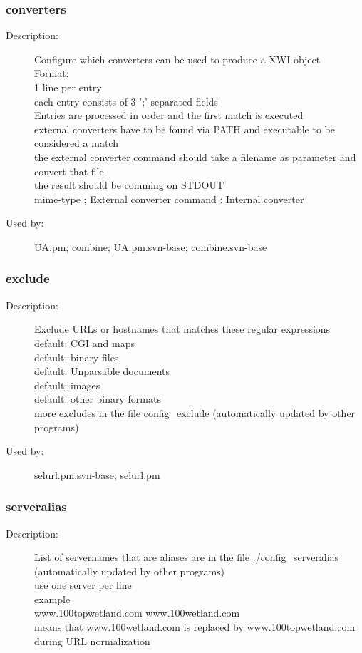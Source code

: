 \subsubsection{converters}
\label{converters}
\begin{description}
\item[Description:] Configure which converters can be used to produce a XWI object \\ Format: \\   1 line per entry \\   each entry consists of 3 ';' separated fields \\ Entries are processed in order and the first match is executed \\   external converters have to be found via PATH and executable to be considered a match \\   the external converter command should take a filename as parameter and convert that file \\    the result should be comming on STDOUT \\  mime-type   ;   External converter command ; Internal converter
\item[Used by:] UA.pm; combine; UA.pm.svn-base; combine.svn-base
\end{description}
\subsubsection{exclude}
\label{exclude}
\begin{description}
\item[Description:] Exclude URLs or hostnames that matches these regular expressions \\  default: CGI and maps \\  default: binary files \\  default: Unparsable documents \\  default: images \\  default: other binary formats \\ more excludes in the file config\_exclude (automatically updated by other programs)
\item[Used by:] selurl.pm.svn-base; selurl.pm
\end{description}
\subsubsection{serveralias}
\label{serveralias}
\begin{description}
\item[Description:] List of servernames that are aliases are in the file ./config\_serveralias \\     (automatically updated by other programs) \\ use one server per line \\ example \\ www.100topwetland.com  www.100wetland.com \\   means that www.100wetland.com is replaced by www.100topwetland.com during URL normalization
\end{description}
